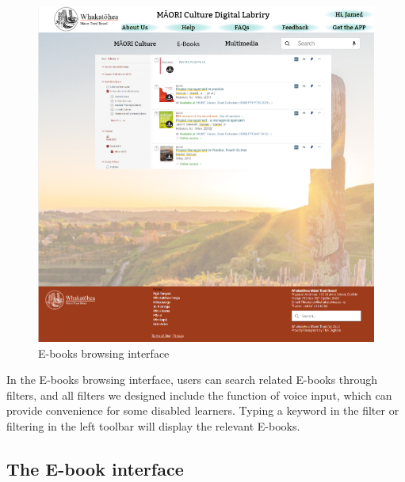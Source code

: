 \begin{figure}[htbp]
  \centerline{\includegraphics[width=400pt]{images/3-2-1.png}}
  \caption{E-books browsing interface}
  \label{fig30}
\end{figure}

In the E-books browsing interface, users can search related E-books through filters, and all filters we designed include the function of voice input, which can provide convenience for some disabled learners. Typing a keyword in the filter or filtering in the left toolbar will display the relevant E-books.

\subsection{The E-book interface}

